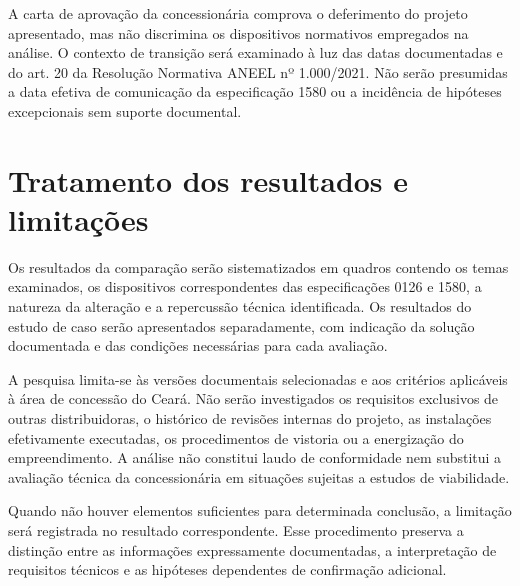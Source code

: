 A carta de aprovação da concessionária comprova o deferimento do projeto apresentado, mas não discrimina os dispositivos normativos empregados na análise. O contexto de transição será examinado à luz das datas documentadas e do art. 20 da Resolução Normativa ANEEL nº 1.000/2021. Não serão presumidas a data efetiva de comunicação da especificação 1580 ou a incidência de hipóteses excepcionais sem suporte documental.

\section{Tratamento dos resultados e limitações}
\label{sec:limitacoes}

Os resultados da comparação serão sistematizados em quadros contendo os temas examinados, os dispositivos correspondentes das especificações 0126 e 1580, a natureza da alteração e a repercussão técnica identificada. Os resultados do estudo de caso serão apresentados separadamente, com indicação da solução documentada e das condições necessárias para cada avaliação.

A pesquisa limita-se às versões documentais selecionadas e aos critérios aplicáveis à área de concessão do Ceará. Não serão investigados os requisitos exclusivos de outras distribuidoras, o histórico de revisões internas do projeto, as instalações efetivamente executadas, os procedimentos de vistoria ou a energização do empreendimento. A análise não constitui laudo de conformidade nem substitui a avaliação técnica da concessionária em situações sujeitas a estudos de viabilidade.

Quando não houver elementos suficientes para determinada conclusão, a limitação será registrada no resultado correspondente. Esse procedimento preserva a distinção entre as informações expressamente documentadas, a interpretação de requisitos técnicos e as hipóteses dependentes de confirmação adicional.
